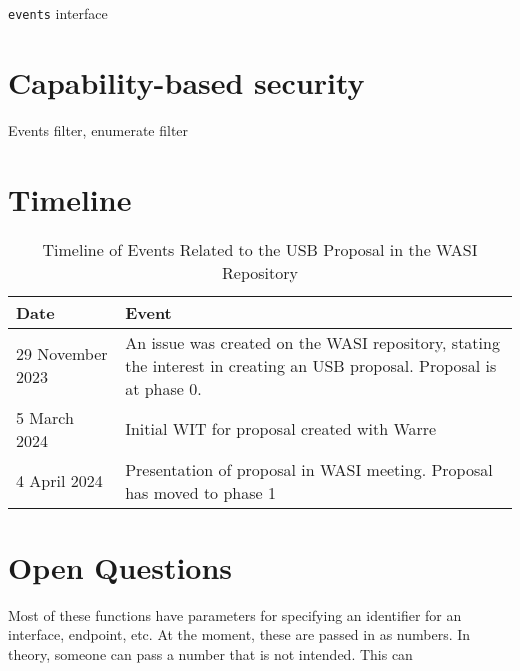 \begin{code}
\inputminted[breaklines]{text}{WIT/wit/events.wit}
\caption{\texttt{events} interface}
\label{code:events_interface}
\end{code}

\section{Capability-based security}
Events filter, enumerate filter

\section{Timeline}

\begin{table}[h]
	\centering
	\begin{tabular}{l|p{12cm}}
		\toprule
		\textbf{Date} & \textbf{Event} \\
		\midrule
		29 November 2023 & An issue \cite{wasi_issue_570} was created on the WASI repository, stating the interest in creating an USB proposal. Proposal is at phase 0. \\
		5 March 2024 & Initial WIT for proposal created with Warre \\
		4 April 2024 & Presentation \cite{wasi_meeting_notes} of proposal in WASI meeting. Proposal has moved to phase 1 \\
		\bottomrule
	\end{tabular}
	\caption{Timeline of Events Related to the USB Proposal in the WASI Repository}
	\label{tab:wasi_usb_proposal}
\end{table}

\section{Open Questions}
Most of these functions have parameters for specifying an identifier for an interface, endpoint, etc. At the moment, these are passed in as numbers. In theory, someone can pass a number that is not intended. This can 
